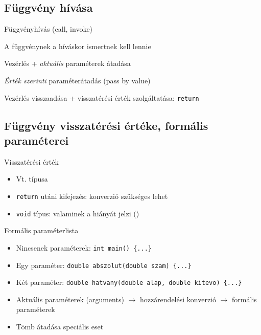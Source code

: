 \documentclass[usenames,dvipsnames,aspectratio=169]{beamer}
\begin{document}
\subsection{Függvény hívása}
\begin{frame}
  \small
  Függvényhívás (call, invoke)
  \begin{compactitem}
    \item A függvénynek a híváskor ismertnek kell lennie
    \item Vezérlés + \emph{aktuális} paraméterek átadása
    \item \emph{Érték szerinti} paraméterátadás (pass by value)
    \item Vezérlés visszaadása + visszatérési érték szolgáltatása: \texttt{return}
  \end{compactitem}
  \footnotesize
  \begin{exampleblock}{}
    \footnotesize
    \vspace{-.2cm}
    
    \vspace{-.2cm}
  \end{exampleblock}
\end{frame}

\subsection{Függvény visszatérési értéke, formális paraméterei}
\begin{frame}
  Visszatérési érték
  \begin{itemize}
    \item Vt. típusa 
    \item \texttt{return} utáni kifejezés:  konverzió szükséges lehet
    \item \texttt{void} típus: valaminek a hiányát jelzi ()
  \end{itemize}
  \vfill
  Formális paraméterlista
  \begin{itemize}
    \item Nincsenek paraméterek: \texttt{int main() \{...\}}
    \item Egy paraméter: \texttt{double abszolut(double szam) \{...\}}
    \item Két paraméter: \texttt{double hatvany(double alap, double kitevo) \{...\}}
    \item Aktuális paraméterek (arguments) $\to$ hozzárendelési konverzió $\to$ formális paraméterek
    \item Tömb átadása speciális eset
  \end{itemize}
\end{frame}
\end{document}
